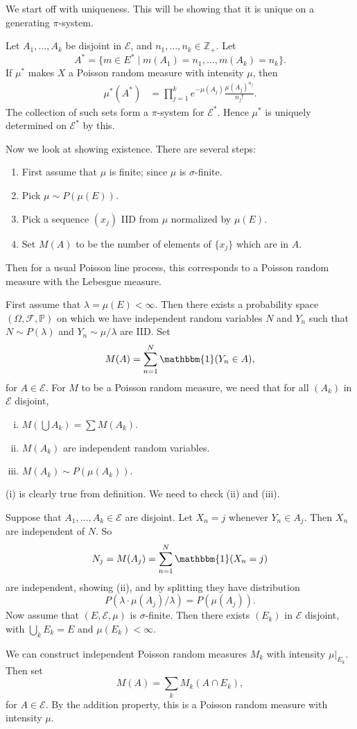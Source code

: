 \documentclass[12pt]{article}
\begin{document}
\begin{proofbox}
	We start off with uniqueness. This will be showing that it is unique on a generating $\pi$-system.

	Let $A_1, \ldots, A_k$ be disjoint in $\mathcal{E}$, and $n_1, \ldots, n_k \in \mathbb{Z}_+$. Let
	\[
		A^{\ast} = \{m \in E^{\ast} \mid m(A_1) = n_1, \ldots, m(A_k) = n_k\}.
	\]
	If $\mu^{\ast}$ makes $X$ a Poisson random measure with intensity $\mu$, then
	\begin{align*}
		\mu^{\ast}(A^{\ast}) &= \prod_{j = 1}^k e^{-\mu(A_j)} \frac{\mu(A_j)^{n_j}}{n_j!}. 
	\end{align*}
	The collection of such sets form a $\pi$-system for $\mathcal{E}^{\ast}$. Hence $\mu^{\ast}$ is uniquely determined on $\mathcal{E}^{\ast}$ by this.

	Now we look at showing existence. There are several steps:
	\begin{enumerate}
		\item First assume that $\mu$ is finite; since $\mu$ is $\sigma$-finite.
		\item Pick $\mu \sim P(\mu(E))$.
		\item Pick a sequence $(x_j)$ IID from $\mu$ normalized by $\mu(E)$.
		\item Set $M(A)$ to be the number of elements of $\{x_j\}$ which are in $A$.
	\end{enumerate}
	Then for a usual Poisson line process, this corresponds to a Poisson random measure with the Lebesgue measure.

	First assume that $\lambda = \mu(E) < \infty$. Then there exists a probability space $(\Omega, \mathcal{F}, \mathbb{P})$ on which we have independent random variables $N$ and $Y_n$ such that $N \sim P(\lambda)$ and $Y_n \sim \mu/\lambda$ are IID. Set
	\[
	M(A) = \sum_{n = 1}^N \mathbbm{1}(Y_n \in A),
	\]
	for $A \in \mathcal{E}$. For $M$ to be a Poisson random measure, we need that for all $(A_k)$ in $\mathcal{E}$ disjoint,
	\begin{enumerate}[(i)]
		\item $M(\bigcup A_k) = \sum M(A_k)$.
		\item $M(A_k)$ are independent random variables.
		\item $M(A_k) \sim P(\mu(A_k)).$
	\end{enumerate}
	(i) is clearly true from definition. We need to check (ii) and (iii).

	Suppose that $A_1, \ldots, A_k \in \mathcal{E}$ are disjoint. Let $X_n = j$ whenever $Y_n \in A_j$. Then $X_n$ are independent of $N$. So
	\[
	N_j = M(A_j) = \sum_{n = 1}^N \mathbbm{1}(X_n = j)
	\]
	are independent, showing (ii), and by splitting they have distribution
	\[
	P(\lambda \cdot \mu(A_j)/\lambda) = P(\mu(A_j)).
	\]
	Now assume that $(E, \mathcal{E}, \mu)$ is $\sigma$-finite. Then there exists $(E_k)$ in $\mathcal{E}$ disjoint, with $\bigcup_k E_k = E$ and $\mu(E_k) < \infty$.

	We can construct independent Poisson random measures $M_k$ with intensity $\mu|_{E_k}$. Then set
	\[
	M(A) = \sum_k M_k(A \cap E_k),
	\]
	for $A \in \mathcal{E}$. By the addition property, this is a Poisson random measure with intensity $\mu$.
\end{proofbox}
\end{document}
